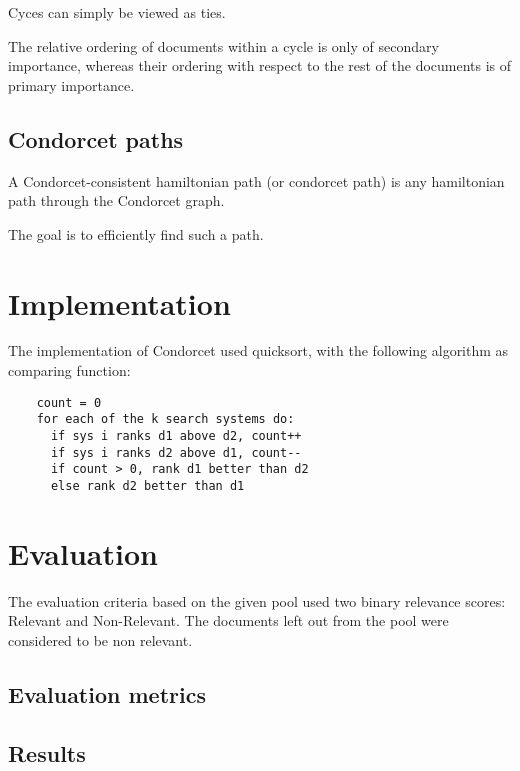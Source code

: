 	Cyces can simply be viewed as ties.

	The relative ordering of documents within a cycle is only of
	secondary importance, whereas their ordering with respect
	to the rest of the documents is of primary importance.

	\subsection{Condorcet paths}

	A Condorcet-consistent hamiltonian path (or condorcet path) is any
	hamiltonian path through the Condorcet graph.

	The goal is to efficiently find such a path.

    \section{Implementation}

    The implementation of Condorcet used quicksort, with the following algorithm
	as comparing function:

	\begin{lstlisting}
	count = 0
	for each of the k search systems do:
	  if sys i ranks d1 above d2, count++
	  if sys i ranks d2 above d1, count--
	  if count > 0, rank d1 better than d2
	  else rank d2 better than d1
	\end{lstlisting}

    \section{Evaluation}

	The evaluation criteria based on the given pool used two binary relevance scores:
	Relevant and Non-Relevant.
	The documents left out from the pool were considered to be non relevant.

        \subsection{Evaluation metrics}

	    \subsection{Results}

